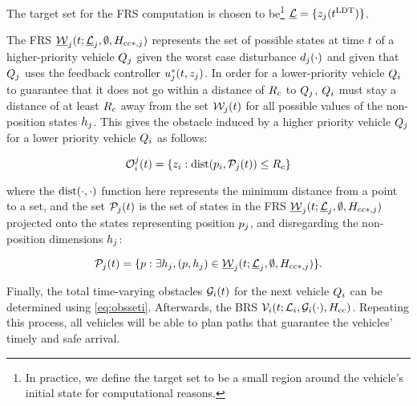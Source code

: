 The target set for the FRS computation is chosen to be\footnote{In practice, we define the target set to be a small region around the vehicle's initial state for computational reasons.} $\underline {\mathcal{L}} = \{z_j(t^\text{LDT})\}$.

The FRS $\underline{\mathcal{W}}_j(t; \underline{\mathcal{L}}_j, \emptyset, H_{cc*,j})$ represents the set of possible states at time $t$ of a higher-priority vehicle $Q_{j}$ given the worst case disturbance $d_j(\cdot)$ and given that $Q_{j}$ uses the feedback controller $u_j^*(t, z_j)$. In order for a lower-priority vehicle $Q_{i}$ to guarantee that it does not go within a distance of $R_c$ to $Q_{j}$, $Q_{i}$ must stay a distance of at least $R_c$ away from the set $\mathcal{W}_j(t)$ for all possible values of the non-position states $h_j$. This gives the obstacle induced by a higher priority vehicle $Q_{j}$ for a lower priority vehicle $Q_{i}$ as follows:

\begin{equation}
\mathcal{O}_i^j(t) = \{z_i: \text{dist}(p_i, \mathcal{P}_j(t)) \le R_c \}
\end{equation}

\noindent where the $\text{dist}(\cdot, \cdot)$ function here represents the minimum distance from a point to a set, and the set $\mathcal{P}_j(t)$ is the set of states in the FRS $\underline{\mathcal{W}}_j(t; \underline{\mathcal{L}}_j, \emptyset, H_{cc*,j})$ projected onto the states representing position $p_j$, and disregarding the non-position dimensions $h_j$:

\begin{equation}
\mathcal{P}_j(t) = \{p: \exists h_j, (p, h_j) \in \underline{\mathcal{W}}_j(t; \underline{\mathcal{L}}_j, \emptyset, H_{cc*,j})\}.
\end{equation}

Finally, the total time-varying obstacles $\mathcal{G}_i(t)$ for the next vehicle $Q_{i}$ can be determined using \eqref{eq:obsseti}. Afterwards, the BRS $\mathcal{V}_i(t; \mathcal{L}_i, \mathcal{G}_i(\cdot), H_{\text{cc}})$. Repeating this process, all vehicles will be able to plan paths that guarantee the vehicles' timely and safe arrival.

